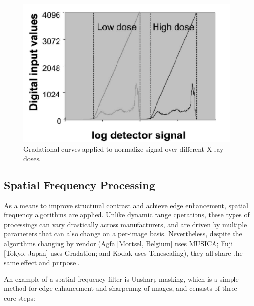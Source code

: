 \documentclass[nomenclature, english, bibtex]{kththesis}
\numberwithin{listing}{chapter}
\begin{document}
\begin{figure}[H]
    \centering
    \includegraphics[width=1.0\textwidth]{figures/LUT.png}
    \caption{Gradational curves applied to normalize signal over different X-ray doses\cite[Figure~3]{Prokop2003}.}
    \label{fig:histogram_stretching}
\end{figure}


\subsection{Spatial Frequency Processing}

As a means to improve structural contrast and achieve edge enhancement, spatial frequency algorithms are applied.
Unlike dynamic range operations, these types of processings can vary drastically across manufacturers, and
are driven by multiple parameters that can also change on a per-image basis. Nevertheless, despite the algorithms
changing by vendor (Agfa [Mortsel, Belgium] uses MUSICA; Fuji [Tokyo, Japan] uses Gradation; and Kodak uses Tonescaling),
they all share the same effect and purpose \cite[p.~119]{carterDigitalRadiographyPACS2010}.

An example of a spatial frequency filter is Unsharp masking, which is a simple method for edge enhancement and sharpening of images,
and consists of three core steps:
\end{document}
